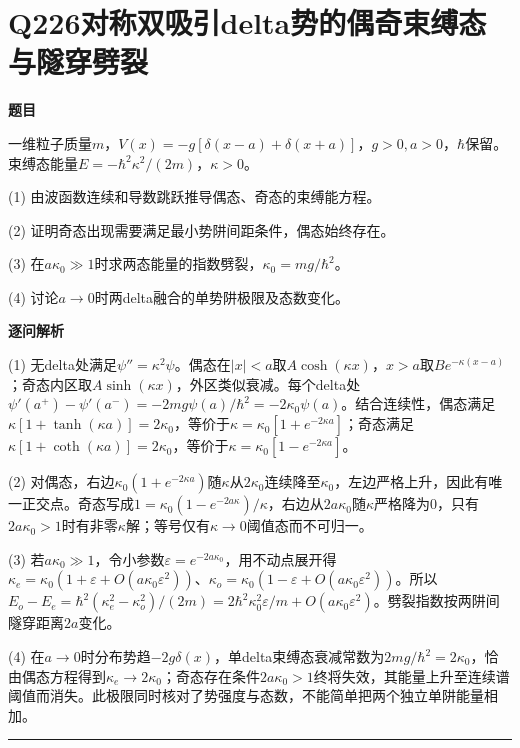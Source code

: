 \documentclass[UTF8,a4paper,11pt,oneside,openany]{ctexbook}
\begin{document}
\section*{Q226\quad 对称双吸引delta势的偶奇束缚态与隧穿劈裂}
\textbf{题目}\par
一维粒子质量$m$，$V(x)=-g[\delta(x-a)+\delta(x+a)]$，$g>0,a>0$，$\hbar$保留。束缚态能量$E=-\hbar^2\kappa^2/(2m)$，$\kappa>0$。
\par\smallskip\noindent (1) 由波函数连续和导数跳跃推导偶态、奇态的束缚能方程。
\par\smallskip\noindent (2) 证明奇态出现需要满足最小势阱间距条件，偶态始终存在。
\par\smallskip\noindent (3) 在$a\kappa_0\gg1$时求两态能量的指数劈裂，$\kappa_0=mg/\hbar^2$。
\par\smallskip\noindent (4) 讨论$a\to0$时两delta融合的单势阱极限及态数变化。
\par\medskip\textbf{逐问解析}\par
\par\smallskip\noindent (1) 无delta处满足$\psi''=\kappa^2\psi$。偶态在$|x|<a$取$A\cosh(\kappa x)$，$x>a$取$Be^{-\kappa(x-a)}$；奇态内区取$A\sinh(\kappa x)$，外区类似衰减。每个delta处$\psi'(a^+)-\psi'(a^-)=-2mg\psi(a)/\hbar^2=-2\kappa_0\psi(a)$。结合连续性，偶态满足$\kappa[1+\tanh(\kappa a)]=2\kappa_0$，等价于$\kappa=\kappa_0[1+e^{-2\kappa a}]$；奇态满足$\kappa[1+\coth(\kappa a)]=2\kappa_0$，等价于$\kappa=\kappa_0[1-e^{-2\kappa a}]$。
\par\smallskip\noindent (2) 对偶态，右边$\kappa_0(1+e^{-2\kappa a})$随$\kappa$从$2\kappa_0$连续降至$\kappa_0$，左边严格上升，因此有唯一正交点。奇态写成$1=\kappa_0(1-e^{-2a\kappa})/\kappa$，右边从$2a\kappa_0$随$\kappa$严格降为0，只有$2a\kappa_0>1$时有非零$\kappa$解；等号仅有$\kappa\to0$阈值态而不可归一。
\par\smallskip\noindent (3) 若$a\kappa_0\gg1$，令小参数$\varepsilon=e^{-2a\kappa_0}$，用不动点展开得$\kappa_e=\kappa_0(1+\varepsilon+O(a\kappa_0\varepsilon^2))$、$\kappa_o=\kappa_0(1-\varepsilon+O(a\kappa_0\varepsilon^2))$。所以$E_o-E_e=\hbar^2(\kappa_e^2-\kappa_o^2)/(2m)=2\hbar^2\kappa_0^2\varepsilon/m+O(a\kappa_0\varepsilon^2)$。劈裂指数按两阱间隧穿距离$2a$变化。
\par\smallskip\noindent (4) 在$a\to0$时分布势趋$-2g\delta(x)$，单delta束缚态衰减常数为$2mg/\hbar^2=2\kappa_0$，恰由偶态方程得到$\kappa_e\to2\kappa_0$；奇态存在条件$2a\kappa_0>1$终将失效，其能量上升至连续谱阈值而消失。此极限同时核对了势强度与态数，不能简单把两个独立单阱能量相加。
\par\medskip\hrule\medskip
\end{document}
